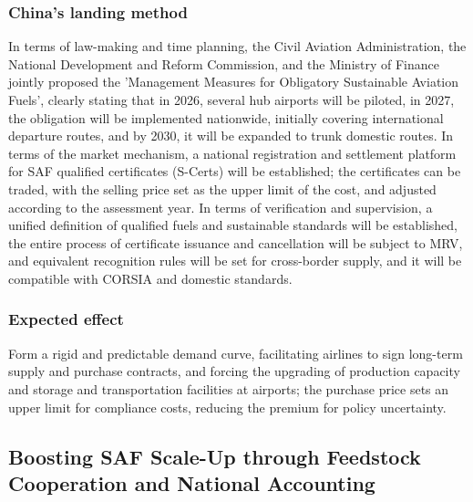 \documentclass[a4paper,11pt]{article}
\begin{document}
\subsubsection{China's landing method}
In terms of law-making and time planning, the Civil Aviation Administration, the National Development and Reform Commission, and the Ministry of Finance jointly proposed the 'Management Measures for Obligatory Sustainable Aviation Fuels', clearly stating that in 2026, several hub airports will be piloted, in 2027, the obligation will be implemented nationwide, initially covering international departure routes, and by 2030, it will be expanded to trunk domestic routes. In terms of the market mechanism, a national registration and settlement platform for SAF qualified certificates (S-Certs) will be established; the certificates can be traded, with the selling price set as the upper limit of the cost, and adjusted according to the assessment year. In terms of verification and supervision, a unified definition of qualified fuels and sustainable standards will be established, the entire process of certificate issuance and cancellation will be subject to MRV, and equivalent recognition rules will be set for cross-border supply, and it will be compatible with CORSIA and domestic standards.

\subsubsection{Expected effect}
Form a rigid and predictable demand curve, facilitating airlines to sign long-term supply and purchase contracts, and forcing the upgrading of production capacity and storage and transportation facilities at airports; the purchase price sets an upper limit for compliance costs, reducing the premium for policy uncertainty.

\subsection{Boosting SAF Scale-Up through Feedstock Cooperation and National Accounting}
\end{document}
